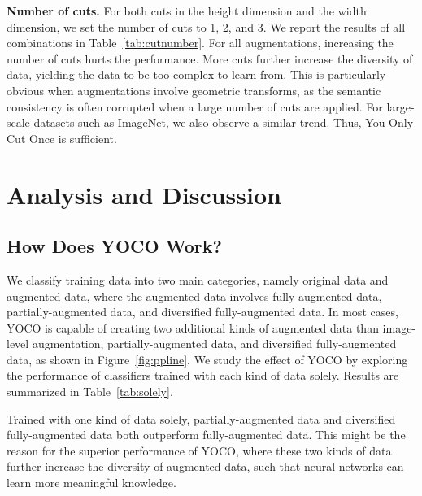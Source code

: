 \documentclass{article}
\begin{document}


\textbf{Number of cuts.}
For both cuts in the height dimension and the width dimension, we set the number of cuts to 1, 2, and 3.
We report the results of all combinations in Table~\ref{tab:cutnumber}. For all augmentations, increasing the number of cuts hurts the performance. More cuts further increase the diversity of data, yielding the data to be too complex to learn from. This is particularly obvious when augmentations involve geometric transforms, as the semantic consistency is often corrupted when a large number of cuts are applied. For large-scale datasets such as ImageNet, we also observe a similar trend. Thus, You Only Cut Once is sufficient. 



\section{Analysis and Discussion}
\label{sec:Analysis}

\subsection{How Does YOCO Work?}
We classify training data into two main categories, namely original data and augmented data, where the augmented data involves fully-augmented data, partially-augmented data, and diversified fully-augmented data. 
In most cases, YOCO is capable of creating two additional kinds of augmented data than image-level augmentation, partially-augmented data, and diversified fully-augmented data, as shown in Figure~\ref{fig:ppline}. We study the effect of YOCO by exploring the performance of classifiers trained with each kind of data solely. Results are summarized in Table~\ref{tab:solely}. 


Trained with one kind of data solely, partially-augmented data and diversified fully-augmented data both outperform fully-augmented data. This might be the reason for the superior performance of YOCO, where these two kinds of data further increase the diversity of augmented data, such that neural networks can learn more meaningful knowledge.
\end{document}
